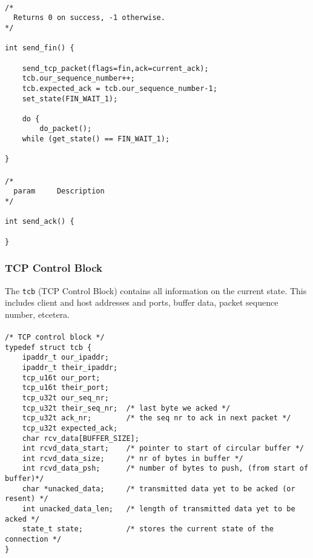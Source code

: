 \documentclass[11pt]{article}
\begin{document}
\paragraph{}


\begin{lstlisting}[title=Procedure send\_fin]
/*
  Returns 0 on success, -1 otherwise.
*/

int send_fin() {

    send_tcp_packet(flags=fin,ack=current_ack);
    tcb.our_sequence_number++;
    tcb.expected_ack = tcb.our_sequence_number-1;
    set_state(FIN_WAIT_1);

    do {
        do_packet();
    while (get_state() == FIN_WAIT_1);

}
\end{lstlisting}


\paragraph{}


\begin{lstlisting}[title=Procedure send\_ack]
/*
  param     Description
*/

int send_ack() {

}
\end{lstlisting}


\subsubsection{TCP Control Block}


The \lstinline|tcb| (TCP Control Block) contains all information on the
current state. This includes client and host addresses and ports, buffer
data, packet sequence number, etcetera.


\paragraph{}


\begin{lstlisting}[title=The TCP Control Block structure]
/* TCP control block */
typedef struct tcb {
    ipaddr_t our_ipaddr;
    ipaddr_t their_ipaddr;
    tcp_u16t our_port;
    tcp_u16t their_port;
    tcp_u32t our_seq_nr;
    tcp_u32t their_seq_nr;  /* last byte we acked */
    tcp_u32t ack_nr;        /* the seq nr to ack in next packet */
    tcp_u32t expected_ack;  
    char rcv_data[BUFFER_SIZE];
    int rcvd_data_start;    /* pointer to start of circular buffer */
    int rcvd_data_size;     /* nr of bytes in buffer */
    int rcvd_data_psh;      /* number of bytes to push, (from start of buffer)*/
    char *unacked_data;     /* transmitted data yet to be acked (or resent) */
    int unacked_data_len;   /* length of transmitted data yet to be acked */
    state_t state;          /* stores the current state of the connection */
}

\end{lstlisting}
\end{document}
